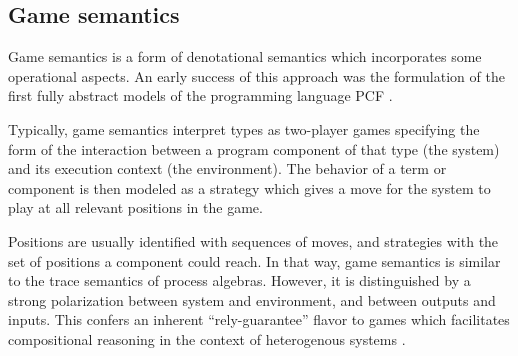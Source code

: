 \documentclass[sigplan,10pt,review,anonymous]{acmart}
\begin{document}

%
%
%


\subsection{Game semantics} %


Game semantics is a form of denotational semantics which
incorporates some operational aspects.
An early success of this approach was
the formulation of the first fully abstract models
of the programming language PCF \cite{pcfajm,pcfho}.

Typically,
game semantics interpret
types as two-player games
specifying the form of the interaction
between a program component of that type
(the system)
and its execution context
(the environment).
The behavior of a term or component
is then modeled as a strategy
which gives a move for the system to play
at all relevant positions in the game.

Positions are usually identified with sequences of moves,
and strategies with the set of positions
a component could reach.
In that way,
game semantics is similar to
the trace semantics of process algebras.
However, it is distinguished
by a strong polarization between
system and environment,
and between outputs and inputs.
This confers an inherent ``rely-guarantee'' flavor
to games which facilitates compositional reasoning
in the context of heterogenous systems \cite{cspgs}.
\end{document}
